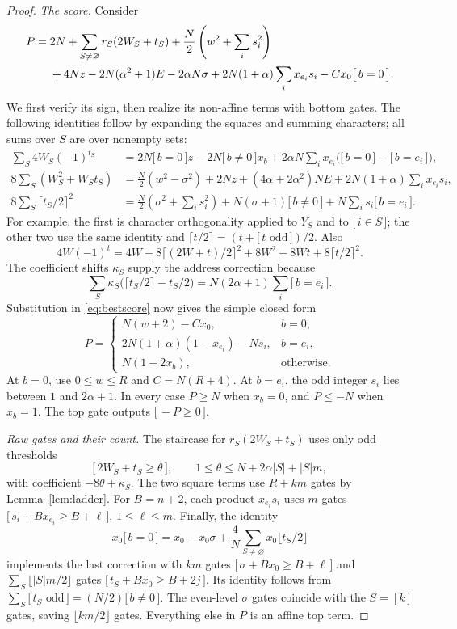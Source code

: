 \documentclass[11pt,letterpaper]{article}
\theoremstyle{remark}
\newcommand{\ind}[1]{\bigl[\,#1\,\bigr]}
\begin{document}
\begin{proof}
\emph{The score.} Consider
\begin{align}\label{eq:bestscore}
P={}&2N+\sum_{S\ne\varnothing}r_S(2W_S+t_S)
 +\frac N2\left(w^2+\sum_i s_i^2\right)\notag\\
 &+4Nz-2N(\alpha^2+1)E-2\alpha N\sigma
 +2N(1+\alpha)\sum_i x_{e_i}s_i-Cx_0\ind{b=0}.
\end{align}
We first verify its sign, then realize its non-affine terms with bottom gates.
The following identities follow by expanding the squares and summing
characters; all sums over $S$ are over nonempty sets:
\begin{align*}
\sum_S4W_S(-1)^{t_S}
 &=2N\ind{b=0}z-2N\ind{b\ne0}x_b
   +2\alpha N\sum_i x_{e_i}\bigl(\ind{b=0}-\ind{b=e_i}\bigr),\\
8\sum_S(W_S^2+W_St_S)
 &=\frac N2(w^2-\sigma^2)+2Nz+(4\alpha+2\alpha^2)NE
   +2N(1+\alpha)\sum_i x_{e_i}s_i,\\
8\sum_S\lceil t_S/2\rceil^2
 &=\frac N2\left(\sigma^2+\sum_i s_i^2\right)
   +N(\sigma+1)\ind{b\ne0}+N\sum_i s_i\ind{b=e_i}.
\end{align*}
For example, the first is character orthogonality applied to $Y_S$ and to
$\ind{i\in S}$; the other two use the same identity and
$\lceil t/2\rceil=(t+\ind{t\text{ odd}})/2$.
Also
\[
4W(-1)^t=4W-8\lceil(2W+t)/2\rceil^2+8W^2+8Wt+8\lceil t/2\rceil^2.
\]
The coefficient shifts $\kappa_S$ supply the address correction because
\[
\sum_S\kappa_S\bigl(\lceil t_S/2\rceil-t_S/2\bigr)
 =N(2\alpha+1)\sum_i\ind{b=e_i}.
\]
Substitution in \eqref{eq:bestscore} now gives the simple closed form
\begin{equation}\label{eq:bestclosed}
P=\begin{cases}
N(w+2)-Cx_0,&b=0,\\
2N(1+\alpha)(1-x_{e_i})-Ns_i,&b=e_i,\\
N(1-2x_b),&\text{otherwise}.
\end{cases}
\end{equation}
At $b=0$, use $0\le w\le R$ and $C=N(R+4)$. At $b=e_i$, the odd
integer $s_i$ lies between $1$ and $2\alpha+1$. In every case $P\ge N$
when $x_b=0$, and $P\le-N$ when $x_b=1$. The top gate outputs $\ind{-P\ge0}$.

\emph{Raw gates and their count.}
The staircase for $r_S(2W_S+t_S)$ uses only odd thresholds
\[
\ind{2W_S+t_S\ge\theta},\qquad
1\le\theta\le N+2\alpha|S|+|S|m,
\]
with coefficient $-8\theta+\kappa_S$. The two square terms use $R+km$
gates by Lemma~\ref{lem:ladder}. For $B=n+2$, each product $x_{e_i}s_i$
uses $m$ gates $\ind{s_i+Bx_{e_i}\ge B+\ell}$, $1\le\ell\le m$.
Finally, the identity
\[
x_0\ind{b=0}=x_0-x_0\sigma+
 \frac4N\sum_{S\ne\varnothing}x_0\lfloor t_S/2\rfloor
\]
implements the last correction with $km$ gates
$\ind{\sigma+Bx_0\ge B+\ell}$ and
$\sum_S\lfloor |S|m/2\rfloor$ gates
$\ind{t_S+Bx_0\ge B+2j}$. Its identity follows from
$\sum_S\ind{t_S\text{ odd}}=(N/2)\ind{b\ne0}$.
The even-level $\sigma$ gates coincide with the $S=[k]$ gates, saving
$\lfloor km/2\rfloor$ gates. Everything else in $P$ is an affine top term.


\end{proof}
\end{document}
